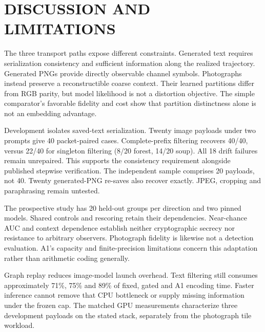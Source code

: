 \section{\uppercase{Discussion and Limitations}}
\label{sec:discussion}
The three transport paths expose different constraints. Generated text requires serialization consistency and sufficient information along the realized trajectory. Generated PNGs provide directly observable channel symbols. Photographs instead preserve a reconstructible coarse context. Their learned partitions differ from RGB parity, but model likelihood is not a distortion objective. The simple comparator's favorable fidelity and cost show that partition distinctness alone is not an embedding advantage.\aifootnote

Development isolates saved-text serialization. Twenty image payloads under two prompts give 40 packet-paired cases. Complete-prefix filtering recovers 40/40, versus 22/40 for singleton filtering (8/20 forest, 14/20 soup). All 18 drift failures remain unrepaired. This supports the consistency requirement alongside published stepwise verification. The independent sample comprises 20 payloads, not 40. Twenty generated-PNG re-saves also recover exactly. JPEG, cropping and paraphrasing remain untested.

The prospective study has 20 held-out groups per direction and two pinned models. Shared controls and rescoring retain their dependencies. Near-chance AUC and context dependence establish neither cryptographic secrecy nor resistance to arbitrary observers. Photograph fidelity is likewise not a detection evaluation. A1's capacity and finite-precision limitations concern this adaptation rather than arithmetic coding generally.

Graph replay reduces image-model launch overhead. Text filtering still consumes approximately 71\%, 75\% and 89\% of fixed, gated and A1 encoding time. Faster inference cannot remove that CPU bottleneck or supply missing information under the frozen cap. The matched GPU measurements characterize three development payloads on the stated stack, separately from the photograph tile workload.
